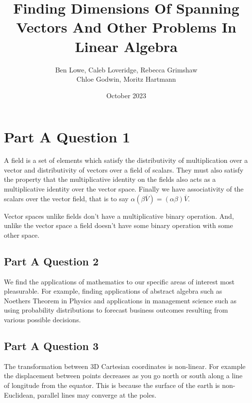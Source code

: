 \documentclass{article}
\title{Finding Dimensions Of Spanning Vectors And Other Problems In Linear Algebra}
\author{Ben Lowe, Caleb Loveridge, Rebecca Grimshaw \\ Chloe Godwin, Moritz Hartmann }
\date{October 2023}
\begin{document}
\maketitle

\tableofcontents

\break


\section{Part A Question 1}
A field is a set of elements which satisfy the distributivity of multiplication over a vector and distributivity of vectors over a field of scalars. They must also satisfy the property that the multiplicative identity on the fields also acts as a multiplicative identity over the vector space. Finally we have associativity of the scalars over the vector field, that is to say $\alpha (\beta \overline{V} )= (\alpha \beta ) \overline{V} $.

Vector spaces unlike fields don't have a multiplicative binary operation. And, unlike the vector space a field doesn't have some binary operation with some other space.

\subsection*{Part A Question 2}

We find the applications of mathematics to our specific areas of interest most pleasurable. For example, finding applications of abstract algebra such as Noethers Theorem in Physics
 and applications in management science such as using probability distributions to forecast business outcomes resulting from various possible decisions. 

\subsection*{Part A Question 3}
The transformation between 3D Cartesian coordinates is non-linear. For example the displacement between points decreases as you go north or south along a line of longitude from the equator. This is because the surface of the earth is non-Euclidean, parallel lines may converge at the poles. 
\end{document}
